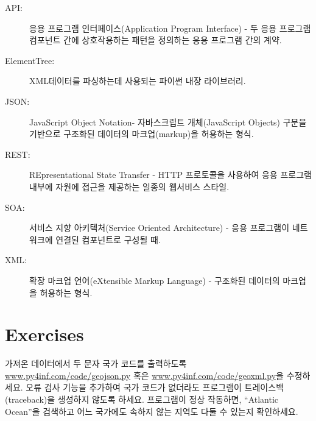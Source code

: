 \begin{description}

\item[API:] 응용 프로그램 인터페이스(Application Program Interface) - 
두 응용 프로그램 컴포넌트 간에 상호작용하는 패턴을 정의하는 응용 프로그램 간의 계약.

\item[ElementTree:] XML데이터를 파싱하는데 사용되는 파이썬 내장 라이브러리.

\item[JSON:] JavaScript Object Notation- 자바스크립트 개체(JavaScript Objects) 구문을 기반으로
구조화된 데이터의 마크업(markup)을 허용하는 형식.

\item[REST:] REpresentational State Transfer -
HTTP 프로토콜을 사용하여 응용 프로그램 내부에 자원에 접근을 제공하는 일종의 웹서비스 스타일.

\item[SOA:] 서비스 지향 아키텍처(Service Oriented Architecture) - 
응용 프로그램이 네트워크에 연결된 컴포넌트로 구성될 때.

\item[XML:] 확장 마크업 언어(eXtensible Markup Language) - 
구조화된 데이터의 마크업을 허용하는 형식.

\end{description}

\section{Exercises}

\begin{ex}
가져온 데이터에서 두 문자 국가 코드를 출력하도록 \url{www.py4inf.com/code/geojson.py} 혹은
\url{www.py4inf.com/code/geoxml.py}을 수정하세요.
오류 검사 기능을 추가하여 국가 코드가 없더라도 프로그램이 트레이스백(traceback)을 생성하지 않도록 하세요.
프로그램이 정상 작동하면, ``Atlantic Ocean''을 검색하고 어느 국가에도 속하지 않는 지역도 다둘 수 있는지 확인하세요. 

\end{ex}

